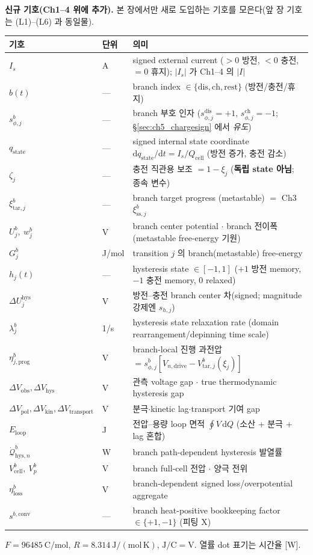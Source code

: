 \documentclass[11pt,a4paper]{article}
\newcommand{\dd}{\mathrm{d}}
\newcommand{\drive}{\mathrm{drive}}
\newcommand{\cell}{\mathrm{cell}}
\newcommand{\prog}{\mathrm{prog}}
\newcommand{\conv}{\mathrm{conv}}
\newcommand{\transp}{\mathrm{transport}}
\newcommand{\dis}{\mathrm{dis}}
\newcommand{\chg}{\mathrm{ch}}
\newcommand{\rst}{\mathrm{rest}}
\newcommand{\hys}{\mathrm{hys}}
\newcommand{\pol}{\mathrm{pol}}
\newcommand{\kin}{\mathrm{kin}}
\newcommand{\obs}{\mathrm{obs}}
\newcommand{\loss}{\mathrm{loss}}
\newcommand{\tar}{\mathrm{tar}}
\newcommand{\stt}{\mathrm{state}}
\newcommand{\sstat}{\mathrm{ss}}
\begin{document}
\textbf{신규 기호(Ch1--4 위에 추가).} 본 장에서만 새로 도입하는 기호를 모은다(앞 장 기호는 (L1)--(L6) 과 동일물).
\begin{longtable}{p{} p{} >{\raggedright\arraybackslash}p{}}
\toprule 기호 & 단위 & 의미 \\ \midrule \endhead
$I_s$ & A & signed external current ($>0$ 방전, $<0$ 충전, $=0$ 휴지); $|I_s|$ 가 Ch1--4 의 $|I|$ \\
$b(t)$ & --- & branch index $\in\{\dis,\chg,\rst\}$ (방전/충전/휴지) \\
$s_{\phi,j}^b$ & --- & branch 부호 인자 ($s_{\phi,j}^\dis=+1$, $s_{\phi,j}^\chg=-1$; \S\ref{sec:ch5_chargesign} 에서 \emph{유도}) \\
$q_\stt$ & --- & signed internal state coordinate $\dd q_\stt/\dd t=I_s/Q_\cell$ (방전 증가, 충전 감소) \\
$\zeta_j$ & --- & 충전 직관용 보조 $=1-\xi_j$ (\textbf{독립 state 아님}; 종속 변수) \\
$\xi_{\tar,j}^b$ & --- & branch target progress (metastable) $=$ Ch3 $\xi_{\sstat,j}^b$ \\
$U_j^b,\ w_j^b$ & V & branch center potential $\cdot$ branch 전이폭 (metastable free-energy 기원) \\
$G_j^b$ & J/mol & transition $j$ 의 branch(metastable) free-energy \\
$h_j(t)$ & --- & hysteresis state $\in[-1,1]$ ($+1$ 방전 memory, $-1$ 충전 memory, $0$ relaxed) \\
$\Delta U_j^\hys$ & V & 방전--충전 branch center 차(signed; magnitude 강제엔 $s_{h,j}$) \\
$\lambda_j^b$ & 1/s & hysteresis state relaxation rate (domain rearrangement/depinning time scale) \\
$\eta_{j,\prog}^b$ & V & branch-local 진행 과전압 $=s_{\phi,j}^b[V_{n,\drive}-V_{\tar,j}^b(\xi_j)]$ \\
$\Delta V_\obs,\Delta V_\hys$ & V & 관측 voltage gap $\cdot$ true thermodynamic hysteresis gap \\
$\Delta V_\pol,\Delta V_\kin,\Delta V_\transp$ & V & 분극$\cdot$kinetic lag$\cdot$transport 기여 gap \\
$E_{\mathrm{loop}}$ & J & 전압--용량 loop 면적 $\oint V\,\dd Q$ (소산 + 분극 + lag 혼합) \\
$\dot{\mathcal Q}_{\hys,n}^b$ & W & branch path-dependent hysteresis 발열률 \\
$V_\cell^b,\ V_p^b$ & V & branch full-cell 전압 $\cdot$ 양극 전위 \\
$\eta_\loss^b$ & V & branch-dependent signed loss/overpotential aggregate \\
$s^{b,\conv}$ & --- & branch heat-positive bookkeeping factor $\in\{+1,-1\}$ (피팅 X) \\
\bottomrule
\end{longtable}
$F=96485\ \mathrm{C/mol}$, $R=8.314\ \mathrm{J/(mol\,K)}$, $\mathrm{J/C}=\mathrm V$. 열률 dot 표기는 시간율 [W].
\end{document}
